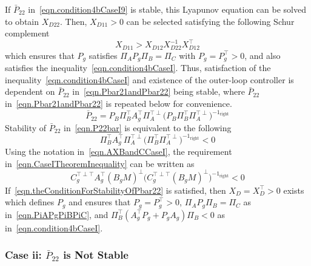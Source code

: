 If $\bar{P}_{22}$ in\ \eqref{eqn.condition4bCaseI9} is stable, this Lyapunov equation can be solved to obtain $X_{D22}$.
Then, $X_{D11}>0$ can be selected satisfying the following Schur complement
\begin{equation}
  \label{eqn.XD11}
  X_{D11} > X_{D12}X_{D22}^{-1}X_{D12}^{\top}
\end{equation}
which ensures that $P_{g}$ satisfies $\Pi_{A}P_{g}\Pi_{B}=\Pi_{C}$ with $P_{g}=P_{g}^{\top}>0$, and also satisfies the inequality\ \eqref{eqn.condition4bCaseI}.
Thus, satisfaction of the inequality\ \eqref{eqn.condition4bCaseI} and existence of the outer-loop controller is dependent on $\bar{P}_{22}$ in\ \eqref{eqn.Pbar21andPbar22} being stable, where $\bar{P}_{22}$ in\ \eqref{eqn.Pbar21andPbar22} is repeated below for convenience.
\begin{equation}
  \label{eqn.P22bar}
  \bar{P}_{22}
  =
  P_{B}\Pi_{B}^{\top}A_{g}^{\top}\Pi_{A}^{\top\perp}\bigr(P_{B}\Pi_{B}^{\top}\Pi_{A}^{\top\perp}\bigr)^{-1_{\text{right}}}
\end{equation}
Stability of $\bar{P}_{22}$ in\ \eqref{eqn.P22bar} is equivalent to the following
\begin{equation}
  \label{eqn.CaseITheoremInequality}
  \Pi_{B}^{\top}A_{g}^{\top}\Pi_{A}^{\top\perp}\bigr(\Pi_{B}^{\top}\Pi_{A}^{\top\perp}\bigr)^{-1_{\text{right}}} < 0
\end{equation}
Using the notation in\ \eqref{eqn.AXBandCCaseI}, the requirement in\ \eqref{eqn.CaseITheoremInequality} can be written as
\begin{equation}
  \label{eqn.theConditionForStabilityOfPbar22}
  C_{g}^{\top\perp\top}A_{g}^{\top}(B_{g}M)^{\perp}\bigr(C_{g}^{\top\perp\top}(B_{g}M)^{\perp}\bigr)^{-1_{\text{right}}} < 0
\end{equation}
If\ \eqref{eqn.theConditionForStabilityOfPbar22} is satisfied, then $X_{D}=X_{D}^{\top}>0$ exists which defines $P_{g}$ and ensures that $P_{g}=P_{g}^{\top}>0$, $\Pi_{A}P_{g}\Pi_{B}=\Pi_{C}$ as in\ \eqref{eqn.PiAPgPiBPiC}, and $\Pi_{B}^{\top}(A_{g}^{\top}P_{g}+P_{g}A_{g})\Pi_{B}<0$ as in\ \eqref{eqn.condition4bCaseI}.

\subsubsection{Case ii: $\bar{P}_{22}$ is Not Stable}

